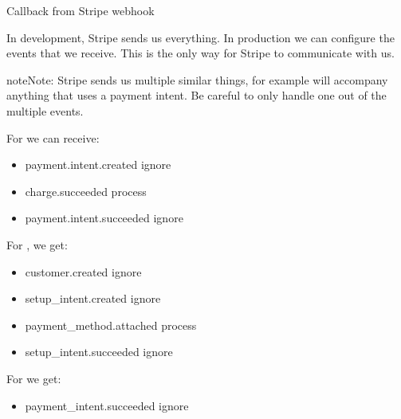 \documentclass[letterpaper,10pt,english]{sphinxmanual}
\begin{document}

\begin{fulllineitems}
\label{\detokenize{payments:payments.core.stripe_webhook}}
Callback from Stripe webhook

In development, Stripe sends us everything. In production we can configure
the events that we receive. This is the only way for Stripe to communicate
with us.

\begin{sphinxadmonition}{note}{Note:}
Stripe sends us multiple similar things, for example 
will accompany anything that uses a payment intent. Be careful to only
handle one out of the multiple events.
\end{sphinxadmonition}

For  we can receive:
\begin{itemize}
\item {} 
payment.intent.created \sphinxhyphen{} ignore

\item {} 
charge.succeeded \sphinxhyphen{} process

\item {} 
payment.intent.succeeded \sphinxhyphen{} ignore

\end{itemize}

For , we get:
\begin{itemize}
\item {} 
customer.created \sphinxhyphen{} ignore

\item {} 
setup\_intent.created \sphinxhyphen{} ignore

\item {} 
payment\_method.attached \sphinxhyphen{} process

\item {} 
setup\_intent.succeeded \sphinxhyphen{} ignore

\end{itemize}

For  we get:
\begin{itemize}
\item {} 
payment\_intent.succeeded \sphinxhyphen{} ignore


\end{itemize}
\end{fulllineitems}
\end{document}
